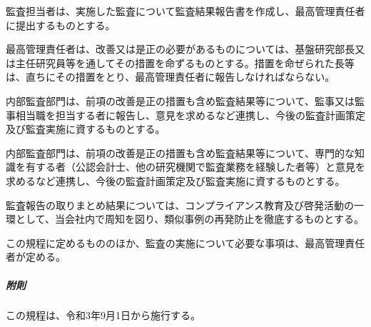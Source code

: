 \documentclass[10pt,a4paper,uplatex]{jsarticle}
\begin{document}
監査担当者は、実施した監査について監査結果報告書を作成し、最高管理責任者に提出するものとする。

最高管理責任者は、改善又は是正の必要があるものについては、基盤研究部長又は主任研究員等を通してその措置を命ずるものとする。措置を命ぜられた長等は、直ちにその措置をとり、最高管理責任者に報告しなければならない。

内部監査部門は、前項の改善是正の措置も含め監査結果等について、監事又は監事相当職を担当する者に報告し、意見を求めるなど連携し、今後の監査計画策定及び監査実施に資するものとする。

内部監査部門は、前項の改善是正の措置も含め監査結果等について、専門的な知識を有する者（公認会計士、他の研究機関で監査業務を経験した者等）と意見を求めるなど連携し、今後の監査計画策定及び監査実施に資するものとする。

監査報告の取りまとめ結果については、コンプライアンス教育及び啓発活動の一環として、当会社内で周知を図り、類似事例の再発防止を徹底するものとする。

この規程に定めるもののほか、監査の実施について必要な事項は、最高管理責任者が定める。

\vspace{1cm}
\subparagraph{附則}
この規程は、令和3年9月1日から施行する。
\end{document}
